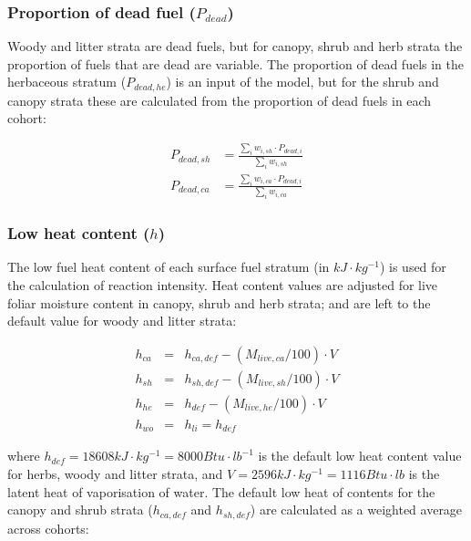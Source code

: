 \documentclass[]{book}
\begin{document}
\subsubsection{\texorpdfstring{Proportion of dead fuel
(\(P_{dead}\))}{Proportion of dead fuel (P\_\{dead\})}}\label{proportion-of-dead-fuel-p_dead}

Woody and litter strata are dead fuels, but for canopy, shrub and herb
strata the proportion of fuels that are dead are variable. The
proportion of dead fuels in the herbaceous stratum (\(P_{dead,he}\)) is
an input of the model, but for the shrub and canopy strata these are
calculated from the proportion of dead fuels in each cohort:

\begin{eqnarray}
P_{dead,sh} &= \frac{\sum_{i}{w_{i,sh} \cdot P_{dead,i}}}{\sum_{i}{w_{i,sh}}} \\
P_{dead, ca} &= \frac{\sum_{i}{w_{i,ca} \cdot P_{dead,i}}}{\sum_{i}{w_{i,ca}}}
\end{eqnarray}

\subsubsection{\texorpdfstring{Low heat content
(\(h\))}{Low heat content (h)}}\label{low-heat-content-h}

The low fuel heat content of each surface fuel stratum (in
\(kJ\cdot kg^{-1}\)) is used for the calculation of reaction intensity.
Heat content values are adjusted for live foliar moisture content in
canopy, shrub and herb strata; and are left to the default value for
woody and litter strata:

\begin{eqnarray}
h_{ca} &=& h_{ca, def} - (M_{live, ca}/100)\cdot V \\
h_{sh} &=& h_{sh, def} - (M_{live, sh}/100)\cdot V \\
h_{he} &=& h_{def} - (M_{live, he}/100)\cdot V \\
h_{wo} &=& h_{li} = h_{def}
\end{eqnarray}

where \(h_{def} = 18608 kJ\cdot kg^{-1} = 8000 Btu\cdot lb^{-1}\) is the
default low heat content value for herbs, woody and litter strata, and
\(V = 2596 kJ\cdot kg^{-1} = 1116 Btu\cdot lb\) is the latent heat of
vaporisation of water. The default low heat of contents for the canopy
and shrub strata (\(h_{ca, def}\) and \(h_{sh, def}\)) are calculated as
a weighted average across cohorts:
\end{document}
